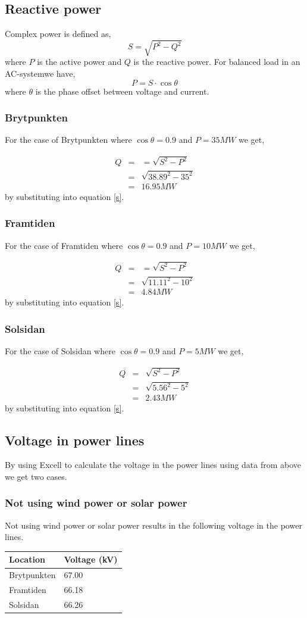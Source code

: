 \documentclass{report}
\newcommand{\case}[1]{\subsubsection*{#1}}
\newcommand{\ac}{AC-system}
\newcommand{\mysubpart}[1]{\subsection*{#1}}
\begin{document}
\mysubpart{Reactive power}
Complex power is defined as, \begin{equation}
S = \sqrt{P^2 - Q^2} \label{s}
\end{equation}
where $P$ is the active power and $Q$ is the reactive power. For balanced load in an \ac we have, 
\begin{equation}
P = S \cdot \cos\theta
\end{equation}
where $\theta$ is the phase offset between voltage and current. 

\case{Brytpunkten}
For the case of Brytpunkten where $\cos\theta = 0.9$ and $P = 35 MW$ we get,
 
\begin{eqnarray}
Q&=&   = \sqrt{S^2 - P^2}\\
&=& \sqrt{38.89^2 - 35^2} \\
&=& 16.95 MW \label{res}
\end{eqnarray} 
by substituting into equation \ref{s}.

\case{Framtiden}
For the case of Framtiden where $\cos\theta = 0.9$ and $P = 10 MW$ we get,
 
\begin{eqnarray}
Q&=&   = \sqrt{S^2 - P^2}\\
&=& \sqrt{11.11^2 - 10^2} \\
&=& 4.84 MW \label{res}
\end{eqnarray} 
by substituting into equation \ref{s}.

\case{Solsidan}
For the case of Solsidan where $\cos\theta = 0.9$ and $P = 5 MW$ we get,
 
\begin{eqnarray}
Q&=&  \sqrt{S^2 - P^2}\\
&=& \sqrt{5.56^2 - 5^2} \\
&=& 2.43 MW \label{res}
\end{eqnarray} by substituting into equation \ref{s}.

\mysubpart{Voltage in power lines}\label{Voltage1}
By using Excell to calculate the voltage in the power lines using data from above we get two cases.

\case{Not using wind power or solar power}
Not using wind power or solar power results in the following voltage in the power lines. 

\begin{table}[H] 
\begin{tabular}{ll}
\toprule
Location & Voltage (kV) \\
\midrule
Brytpunkten & 67.00\\
Framtiden  &  66.18\\
Solsidan & 66.26\\
\bottomrule
\end{tabular} 
\end{table} 
\end{document}
